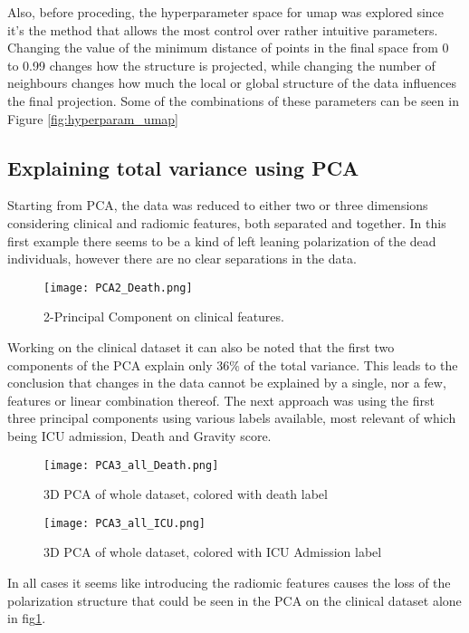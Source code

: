 Also, before proceding, the hyperparameter space for umap was explored since it's the method that allows the most control over rather intuitive parameters.
Changing the value of the minimum distance of points in the final space from 0 to 0.99 changes how the structure is projected, while changing the number of neighbours changes how much the local or global structure of the data influences the final projection.
 Some of the combinations of these parameters can be seen in Figure \ref{fig:hyperparam_umap}


\subsection{Explaining total variance using PCA}

Starting from PCA, the data was reduced to either two or three dimensions considering clinical and radiomic features, both separated and together.
In this first example there seems to be a kind of left leaning polarization of the dead individuals, however there are no clear separations in the data.

\begin{figure}[h!]
\centering
  		\texttt{[image: PCA2\_Death.png]}
        \caption{2-Principal Component on clinical features.  \label{fig:PCA2_death}}
\end{figure}

 Working on the clinical dataset it can also be noted that the first two components of the PCA explain only 36$\%$ of the total variance. This leads to the conclusion that changes in the data cannot be explained by a single, nor a few, features or linear combination thereof. The next approach was  using the first three principal components using various labels available, most relevant of which being ICU admission, Death and Gravity score.

\begin{figure}[h!]
  		\texttt{[image: PCA3\_all\_Death.png]}\label{PCA3_all_death}
  		\caption{3D PCA of whole dataset, colored with death label}
\end{figure}

\begin{figure}[h!]
  		\texttt{[image: PCA3\_all\_ICU.png]}\label{PCA3_all_ICU}
  		\caption{3D PCA of whole dataset, colored with ICU Admission label}
\end{figure}

In all cases it seems like introducing the radiomic features causes the loss of the polarization structure that could be seen in the PCA on the clinical dataset alone in fig\ref{fig:PCA2_death}.
 

